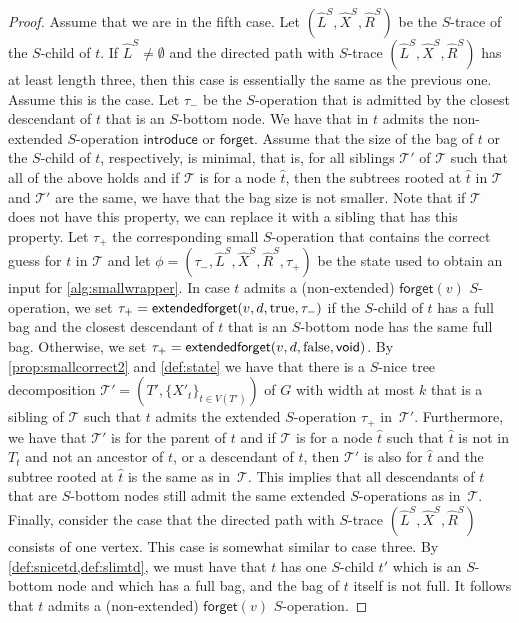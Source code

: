 \documentclass[a4paper,UKenglish,cleveref, autoref, thm-restate, numberwithinsect]{lipics-v2021}
\newcommand{\introduce}{\mathsf{introduce}}
\newcommand{\forget}{\mathsf{forget}}
\newcommand{\extendedforget}{\mathsf{extendedforget}}
\newcommand{\void}{\mathsf{void}}
\newcommand{\true}{\textup{true}}
\newcommand{\false}{\textup{false}}
\newcommand{\slim}{\text{slim}\xspace}
\newcommand{\topheavy}{\text{top-heavy}\xspace}
\begin{document}
\begin{proof}
Assume that we are in the fifth case. Let $(\hat{L}^S, \hat{X}^S, \hat{R}^S)$ be the $S$-trace of the $S$-child of $t$. 
If $\hat{L}^S\neq\emptyset$ and the directed path with $S$-trace $(\hat{L}^S, \hat{X}^S, \hat{R}^S)$ has at least length three, then this case is essentially the same as the previous one. Assume this is the case.
Let $\tau_-$ be the $S$-operation that is admitted by the closest descendant of $t$ that is an $S$-bottom node.
We have that in $t$ admits the non-extended $S$-operation $\introduce$ or $\forget$.
Assume that the size of the bag of $t$ or the $S$-child of $t$, respectively, is minimal, that is, for all siblings $\mathcal{T}'$ of $\mathcal{T}$ such that all of the above holds and if $\mathcal{T}$ is \topheavy for a node $\hat{t}$, then the subtrees rooted at $\hat{t}$ in $\mathcal{T}$ and $\mathcal{T}'$ are the same, we have that the bag size is not smaller.
Note that if $\mathcal{T}$ does not have this property, we can replace it with a sibling that has this property.
Let $\tau_+$ the corresponding small $S$-operation that contains the correct guess for $t$ in $\mathcal{T}$ and let $\phi=(\tau_-,\hat{L}^S, \hat{X}^S, \hat{R}^S,\tau_+)$ be the state used to obtain an input for \cref{alg:smallwrapper}.
In case $t$ admits a (non-extended) $\forget(v)$ $S$-operation, we set $\tau_+=\extendedforget(v,d,\true,\tau_-)$ if the $S$-child of $t$ has a full bag and the closest descendant of $t$ that is an $S$-bottom node has the same full bag. Otherwise, we set $\tau_+=\extendedforget(v,d,\false,\void)$.
    By \cref{prop:smallcorrect2} and \cref{def:state} we have that there is a \slim $S$-nice tree decomposition $\mathcal{T}'=(T',\{X'_t\}_{t\in V(T')})$ of $G$ with width at most $k$ that is a sibling of $\mathcal{T}$ such that $t$ admits the extended $S$-operation $\tau_+$ in~$\mathcal{T}'$. 
    Furthermore, we have that $\mathcal{T}'$ is \topheavy for the parent of $t$ and if $\mathcal{T}$ is \topheavy for a node $\hat{t}$ such that $\hat{t}$ is not in $T_{t}$ and not an ancestor of $t$, or a descendant of $t$,
then $\mathcal{T}'$ is also \topheavy for $\hat{t}$ and the subtree rooted at $\hat{t}$ is the same as in~$\mathcal{T}$. This implies that all descendants of $t$ that are $S$-bottom nodes still admit the same extended $S$-operations as in~$\mathcal{T}$.
Finally, consider the case that the directed path with $S$-trace $(\hat{L}^S, \hat{X}^S, \hat{R}^S)$ consists of one vertex. This case is somewhat similar to case three. By \cref{def:snicetd,def:slimtd}, we must have that $t$ has one $S$-child $t'$ which is an $S$-bottom node and which has a full bag, and the bag of $t$ itself is not full. It follows that $t$ admits a (non-extended) $\forget(v)$ $S$-operation.

\end{proof}
\end{document}
